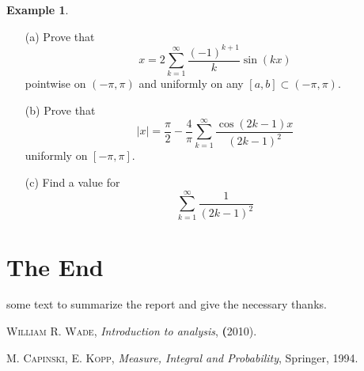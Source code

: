 \documentclass[12pt]{amsart}
\theoremstyle{definition}
\newtheorem{example}[theorem]{Example}
\begin{document}


\begin{example}
    \begin{enumerate}
        \item[(a)] Prove that
        \[
        x = 2\sum_{k=1}^{\infty}\frac{(-1)^{k+1}}{k}\sin(kx)
        \]
        pointwise on $(-\pi,\pi)$ and uniformly on any $[a,b] \subset (-\pi,\pi)$.


        \item[(b)] Prove that
        \[
        |x| = \frac{\pi}{2} - \frac{4}{\pi} \sum_{k=1}^{\infty}\frac{\cos(2k-1)x}{(2k-1)^2}
        \]
        uniformly on $[-\pi,\pi]$.

        \item[(c)] Find a value for
        \[
        \sum_{k=1}^{\infty}\frac{1}{(2k-1)^2}
        \]
    \end{enumerate}
\end{example}

\section{The End}

some text to summarize the report and give the necessary thanks.





\begin{thebibliography}{99}

 \textsc{William R. Wade},  \textit{Introduction to analysis}, \textbf(2010).

 \textsc{M. Capinski, E. Kopp}, \textit{Measure, Integral and Probability}, Springer,
 1994.

\end{thebibliography}
\end{document}
